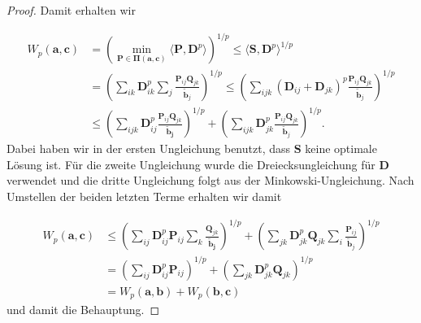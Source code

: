 \documentclass[twoside, 12pt,a4paper]{book}
\newtheorem{remark}[theorem]{Bemerkung}
\numberwithin{equation}{section}
\begin{document}
\begin{proof}
		\noindent Damit erhalten wir
		
		\begin{align}
		W_p(\boldsymbol{a},\boldsymbol{c}) &=\left(\min_{\boldsymbol{P \in \boldsymbol{\Pi}(\boldsymbol{a},\boldsymbol{c})}}{\langle \boldsymbol{P},\boldsymbol{D}^p \rangle}\right)^{1/p} \leq \langle \boldsymbol{S}, \boldsymbol{D}^p \rangle ^{1/p} \\
		&= \left( \sum_{ik}{\boldsymbol{D}_{ik}^p} \sum_j{\frac{\boldsymbol{P}_{ij}\boldsymbol{Q}_{jk}}{\tilde{\boldsymbol{b}}_j}}\right)^{1/p} \leq \left(\sum_{ijk}{(\boldsymbol{D}_{ij} + \boldsymbol{D}_{jk})^p \frac{\boldsymbol{P}_{ij}\boldsymbol{Q}_{jk}}{\tilde{\boldsymbol{b}}_j}}\right)^{1/p}\\
		&\leq \left(\sum_{ijk}{\boldsymbol{D}_{ij}^p}\frac{\boldsymbol{P}_{ij}\boldsymbol{Q}_{jk}}{\boldsymbol{\tilde{\boldsymbol{b}}_j}}\right)^{1/p} + \left(\sum_{ijk}{\boldsymbol{D}_{jk}^p \frac{\boldsymbol{P}_{ij}\boldsymbol{Q}_{jk}}{\tilde{\boldsymbol{b}}_j}}\right)^{1/p}.	 	\end{align}
	\noindent Dabei haben wir in der ersten Ungleichung benutzt, dass $\boldsymbol{S}$ keine optimale Lösung ist. Für die zweite Ungleichung wurde die Dreiecksungleichung für $\boldsymbol{D}$ verwendet und die dritte Ungleichung folgt aus der Minkowski-Ungleichung.
	Nach Umstellen der beiden letzten Terme erhalten wir damit
	
	\begin{align*}
	W_p(\boldsymbol{a},\boldsymbol{c}) 
	&\leq \left(\sum_{ij}{\boldsymbol{D}_{ij}^p\boldsymbol{P}_{ij}}\sum_k{\frac{\boldsymbol{Q}_{jk}}{\boldsymbol{\tilde{\boldsymbol{b}}_j}}}\right)^{1/p} + \left(\sum_{jk}{\boldsymbol{D}_{jk}^p\boldsymbol{Q}_{jk}}\sum_i{ \frac{\boldsymbol{P}_{ij}}{\tilde{\boldsymbol{b}}_j}}\right)^{1/p}\\
	&= \left(\sum_{ij}{\boldsymbol{D}_{ij}^p\boldsymbol{P}_{ij}}\right)^{1/p}
	+
	\left(\sum_{jk}{\boldsymbol{D}_{jk}^p\boldsymbol{Q}_{jk}}\right)^{1/p}\\
	&= W_p(\boldsymbol{a},\boldsymbol{b})
	+ W_p(\boldsymbol{b},\boldsymbol{c})  
	\end{align*}
	und damit die Behauptung.
	\end{proof}

	
\end{document}
